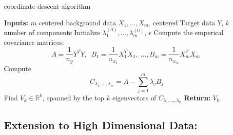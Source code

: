 \documentclass[12pt]{article}
\begin{document}
\begin{algorithm}[ht]
  \caption{coordinate descent algorithm}
  \label{alg:uca-multiple}
  \textbf{Inputs: } $m$ centered background data $X_1,\ldots, X_m $, centered Target data $Y$, $k$ number of components\;
  Initialize $\lambda_{1}^{(0)}, \ldots,\lambda_{m}^{(0)} $, $\epsilon$\;
  Compute the emperical covariance matrices:
  \[A = \frac{1}{n_y}Y^TY,\;\; B_1 = \frac{1}{n_{x_1}}X_1^TX_1,\;\ldots, B_m = \frac{1}{n_{x_m}}X_m^TX_m\; \]
  Compute \[C_{\lambda_1, \ldots, \lambda_m} = A - \sum^{m}_{j = 1}{\lambda_j B_j}\]
  Find $V_k\in \mathbb{R}^k$, spanned by the top $k$ eigenvectors of $C_{\lambda_1, \ldots, \lambda_k}$\;
  \textbf{Return: } $V_k$
\end{algorithm}



\subsection{Extension to High Dimensional Data:}
\end{document}
